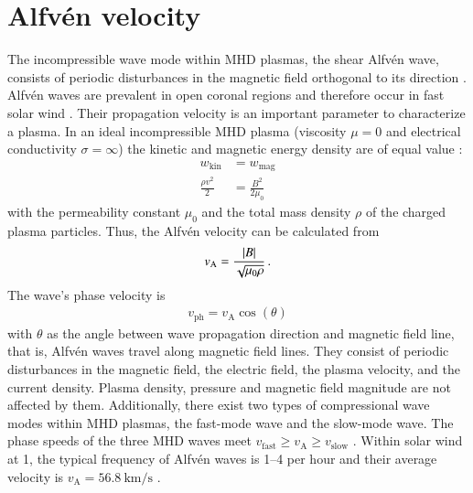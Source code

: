

\section{Alfvén velocity}
\label{sec:alfvén_velocity}
The incompressible wave mode within MHD plasmas, the shear Alfvén wave, consists of periodic disturbances in the magnetic field orthogonal to its direction \citep{Alfven1942}. Alfvén waves are prevalent in open coronal regions and therefore occur in fast solar wind \citep{Cranmer2005}. Their propagation velocity is an important parameter to characterize a plasma. In an ideal incompressible MHD plasma (viscosity $\mu = 0$ and electrical conductivity $\sigma = \infty$) the kinetic and magnetic energy density are of equal value \citep[p.~51]{Kivelson1995}: 
\begin{align}
	w_\text{kin} &= w_\text{mag}\\
	\frac{\rho v^2}{2} &= \frac{B^2}{2 \mu_0}	\nonumber
\end{align}
with the permeability constant $\mu_0$ and the total mass density $\rho$ of the charged plasma particles. Thus, the Alfvén velocity can be calculated from
\begin{align}
	v_\text{A} = \frac{|B|}{\sqrt{\mu_0 \rho}}	\text{\,.}
\end{align}
The wave's phase velocity is
\begin{align}
	v_\text{ph} = v_\text{A} \cos(\theta)
\end{align}
with $\theta$ as the angle between wave propagation direction and magnetic field line, that is, Alfvén waves travel along magnetic field lines. They consist of periodic disturbances in the magnetic field, the electric field, the plasma velocity, and the current density. Plasma density, pressure and magnetic field magnitude are not affected by them. Additionally, there exist two types of compressional wave modes within MHD plasmas, the fast-mode wave and the slow-mode wave. The phase speeds of the three MHD waves meet $v_\text{fast} \geq v_\text{A} \geq v_\text{slow}$ \citep[p.~52]{Kivelson1995}. Within solar wind at \SI{1}{\au}, the typical frequency of Alfvén waves is 1--4 per hour and their average velocity is $v_\text{A} = \SI{56.8}{\km\per\s}$ \citep{Veselovsky2010}.\\	%

